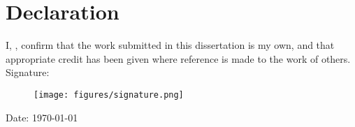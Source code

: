
\section*{Declaration}

\vspace{10mm}

I, \Name{}, confirm that the work submitted in this dissertation is my own, and
that appropriate credit has been given where reference is made to the work of
others.
\\[8mm]
\noindent Signature:


\begin{figure}[h]
  \texttt{[image: figures/signature.png]}
\end{figure}

\noindent Date: \today

\newpage
